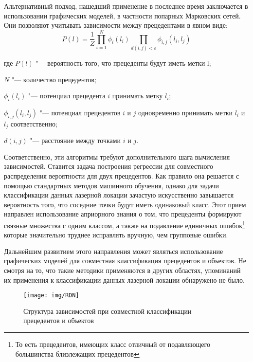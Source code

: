 Альтернативный подход, нашедший применение в последнее время заключается в использовании графических моделей, в частности попарных Марковских сетей. Они позволяют учитывать зависимости между прецедентами в явном виде:
$$
P(l)=\frac{1}{Z}\prod_{i=1}^{N}\phi_i(l_i)\prod_{d(i,j)<\varepsilon}\phi_{i,j}(l_i,l_j)
$$
\begin{ESKDexplanation}
\item[где ] $P(l)$ "--- вероятность того, что прецеденты будут иметь метки l;
\item $N$ "--- количество прецедентов;
\item $\phi_i(l_i)$ "--- потенциал прецедента $i$ принимать метку $l_i$;
\item $\phi_{i,j}(l_i,l_j)$ "--- потенциал прецедентов $i$ и $j$ одновременно принимать метки $l_i$ и $l_j$ соответственно;
\item $d(i,j)$ "--- расстояние между точками $i$ и $j$.
\end{ESKDexplanation}

Соответственно, эти алгоритмы требуют дополнительного шага вычисления зависимостей. Ставится задача построения регрессии для совместного распределения вероятности для двух прецедентов. Как правило она решается с помощью стандартных методов машинного обучения, однако для задачи классификации данных лазерной локации зачастую искусственно завышается вероятность того, что соседние точки будут иметь одинаковый класс\cite{Markov random fields}. Этот прием направлен использование априорного знания о том, что прецеденты формируют связные множества с одним классом, а также на подавление единичных ошибок\footnote{То есть прецедентов, имеющих класс отличный от подавляющего большинства близлежащих прецедентов} которые значительно труднее исправлять вручную, чем групповые ошибки.

Дальнейшим развитием этого направления может являться использование графических моделей для совместная классификация прецедентов и объектов. Не смотря на то, что такие методики применяются в других областях\cite{RDN}, упоминаний их применения к классификации данных лазерной локации обнаружено не было.

\begin{figure}[h]
\begin{center}
\texttt{[image: img/RDN]}
\end{center}
\caption{Структура зависимостей при совместной классификации прецедентов и объектов}
\label{RDN}
\end{figure}

